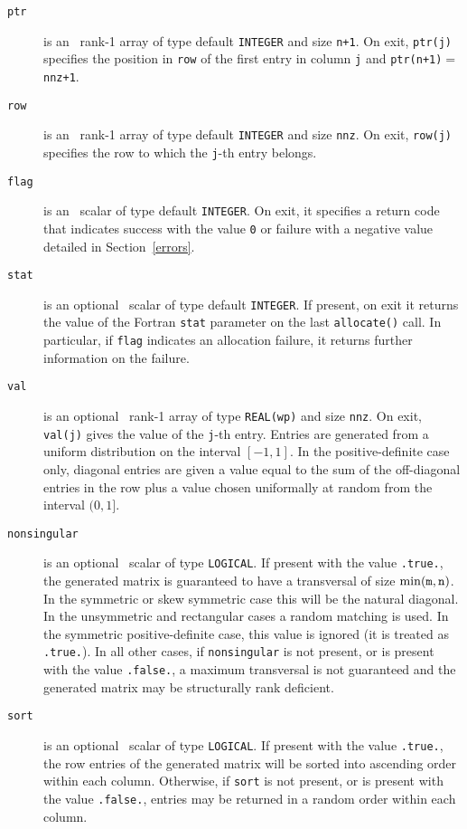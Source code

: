 \begin{description}
\item[\texttt{ptr}] is an \intentout\ rank-1 array of type default {\tt INTEGER}
   and size {\tt n+1}. On exit, {\tt ptr(j)} specifies the position in {\tt row}
   of the first entry in column {\tt j} and {\tt ptr(n+1)$=$nnz+1}.

\item[\texttt{row}] is an \intentout\ rank-1 array of type default {\tt INTEGER}
   and size {\tt nnz}. On exit, {\tt row(j)} specifies the row to which the
   {\tt j}-th entry belongs.

\item[\texttt{flag}] is an \intentout\ scalar of type default {\tt INTEGER}.
   On exit, it specifies a return code that indicates success with the value
   {\tt 0} or failure with a negative value detailed in Section~\ref{errors}.

\item[\texttt{stat}] is an optional \intentout\ scalar of type default
   {\tt INTEGER}. If present, on exit it returns the value of the Fortran
   \texttt{stat} parameter on the last \texttt{allocate()} call. In particular,
   if \texttt{flag} indicates an allocation failure, it returns further
   information on the failure.

\item[\texttt{val}] is an optional \intentout\ rank-1 array of type
   {\tt REAL(wp)} and size \texttt{nnz}. On exit, \texttt{val(j)} gives
   the value of the \texttt{j}-th entry. Entries are generated from a uniform
   distribution on the interval $[-1,1]$. In the positive-definite case only,
   diagonal entries are given a value equal to the sum of the off-diagonal
   entries in the row plus a value chosen uniformally at random from the
   interval $(0,1]$.

\item[\texttt{nonsingular}] is an optional \intentin\ scalar of type
   {\tt LOGICAL}. If present with the value {\tt .true.}, the generated matrix
   is guaranteed to have a transversal of size $\min({\tt m}, {\tt n})$. In
   the symmetric or skew symmetric case this will be the natural diagonal. In
   the unsymmetric and rectangular cases a random matching is used. In the
   symmetric positive-definite case, this value is ignored (it is treated as
   {\tt.true.}).
   In all other cases, if {\tt nonsingular} is not present, or is present with
   the value {\tt .false.}, a maximum transversal is not guaranteed and the
   generated matrix may be structurally rank deficient.

\item[\texttt{sort}] is an optional \intentin\ scalar of type {\tt LOGICAL}. If
   present with the value {\tt .true.}, the row entries of the generated matrix
   will be sorted into ascending order within each column.
   Otherwise, if {\tt sort} is not present, or is present with the value
   {\tt .false.}, entries may be returned in a random order within each column.

\end{description}

